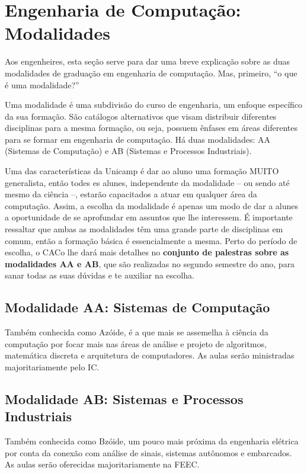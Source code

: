\section{Engenharia de Computação:\\ Modalidades}

Aos engenheires, esta seção serve para dar uma breve explicação sobre as duas  modalidades de graduação em engenharia de computação. Mas, primeiro, “o que é uma  modalidade?” 

Uma modalidade é uma subdivisão do curso de engenharia, um enfoque específico  da sua formação. São catálogos alternativos que visam distribuir diferentes disciplinas  para a mesma formação, ou seja, possuem ênfases em áreas diferentes para se formar  em engenharia de computação. Há duas modalidades: AA (Sistemas de Computação) e  AB (Sistemas e Processos Industriais). 

Uma das características da Unicamp é dar ao aluno uma formação MUITO  generalista, então todes es alunes, independente da modalidade – ou sendo até mesmo  da ciência –, estarão capacitados a atuar em qualquer área da computação. Assim, a  escolha da modalidade é apenas um modo de dar a alunes a oportunidade de se  aprofundar em assuntos que lhe interessem. É importante ressaltar que ambas as  modalidades têm uma grande parte de disciplinas em comum, então a formação básica  é essencialmente a mesma. Perto do período de escolha, o CACo lhe dará mais detalhes no \textbf{conjunto de palestras sobre as modalidades AA e AB}, que são realizadas no segundo  semestre do ano, para sanar todas as suas dúvidas e te auxiliar na escolha. 

\subsection{Modalidade AA: Sistemas de Computação}

Também conhecida como Azóide, é a que mais se assemelha à ciência da computação por focar mais nas áreas de análise e projeto de algoritmos, matemática discreta e  arquitetura de computadores. As aulas serão ministradas majoritariamente pelo IC.

\subsection{Modalidade AB: Sistemas e Processos Industriais}

Também conhecida como Bzóide, um pouco mais próxima da engenharia elétrica por  conta da conexão com análise de sinais, sistemas autônomos e embarcados. As aulas  serão oferecidas majoritariamente na FEEC. 

